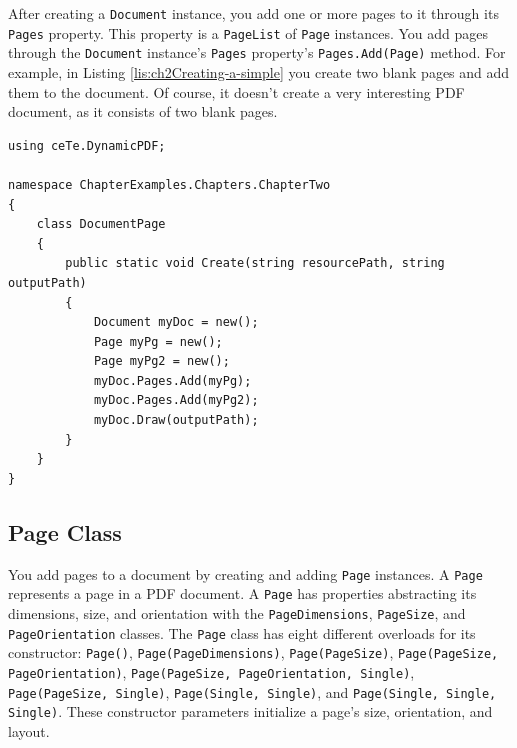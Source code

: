 \documentclass[american,letterpaper]{tufte-book}
\numberwithin{equation}{section}
\numberwithin{figure}{section}
\begin{document}
After creating a \texttt{Document} instance, you add one or more pages
to it through its \texttt{Pages} property. This property is a \texttt{PageList}
of \texttt{Page} instances. You add pages through the \texttt{Document}
instance's \texttt{Pages} property's \texttt{Pages.Add(Page)} method.
For example, in Listing \ref{lis:ch2Creating-a-simple} you create
two blank pages and add them to the document. Of course, it doesn't create a
very interesting PDF document, as it consists of two blank pages.

\bgroup{}
\begin{lstlisting}[caption={Creating a simple PDF Document.},label={lis:ch2Creating-a-simple},basicstyle={\small\ttfamily},breaklines=true]
using ceTe.DynamicPDF;

namespace ChapterExamples.Chapters.ChapterTwo
{
    class DocumentPage
    {
        public static void Create(string resourcePath, string outputPath)
        {
            Document myDoc = new();
            Page myPg = new();
            Page myPg2 = new();
            myDoc.Pages.Add(myPg);
            myDoc.Pages.Add(myPg2);
            myDoc.Draw(outputPath);
        }
    }
}
\end{lstlisting}
\leavevmode\egroup


\subsection{Page Class}
You add pages to a document by creating and adding \texttt{Page} instances.
A \texttt{Page} represents a page in a PDF document. A \texttt{Page}
has properties abstracting its dimensions, size, and orientation with
the \texttt{PageDimensions}, \texttt{PageSize}, and \texttt{PageOrientation}
classes. The \texttt{Page} class has eight different overloads for its constructor:
\texttt{Page()}, \texttt{Page(PageDimensions)}, \texttt{Page(PageSize)},
\texttt{Page(PageSize, PageOrientation)}, \texttt{Page(PageSize, PageOrientation,
Single)}, \texttt{Page(PageSize, Single)}, \texttt{Page(Single, Single)},
and \texttt{Page(Single, Single, Single)}. These constructor parameters
initialize a page's size, orientation, and layout.
\end{document}
